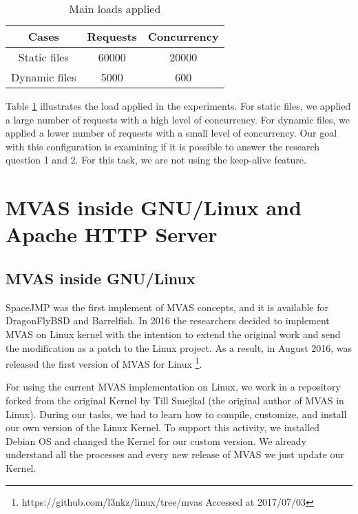 \begin{table}[h!]
  \centering
  \begin{tabular}{|c|c|c|}
    \hline
    Cases & \textbf{Requests} & \textbf{Concurrency}\\
    \hline
    Static files & 60000 & 20000\\
    \hline
    Dynamic files & 5000 & 600 \\
    \hline
  \end{tabular}
  \caption{Main loads applied}
  \label{tab:loads}
\end{table}

Table \ref{tab:loads} illustrates the load applied in the experiments. For
static files, we applied a large number of requests with a high level of
concurrency. For dynamic files, we applied a lower number of requests with a
small level of concurrency. Our goal with this configuration is examining if it
is possible to answer the research question 1 and 2. For this task, we are not
using the keep-alive feature.

\section{MVAS inside GNU/Linux and Apache HTTP Server}
\label{sec:mvas_inside_httpd}

\subsection{MVAS inside GNU/Linux}
 
SpaceJMP \cite{spacejmp} was the first implement of MVAS concepts, and it is
available for DragonFlyBSD and Barrelfish. In 2016 the researchers decided to
implement MVAS on Linux kernel with the intention to extend the original work
and send the modification as a patch to the Linux project. As a result, in
August 2016, was released the first version of MVAS for Linux
\footnote{https://github.com/l3nkz/linux/tree/mvas Accessed at 2017/07/03}.
 
For using the current MVAS implementation on Linux, we work in a repository
forked from the original Kernel by Till Smejkal (the original author of MVAS in
Linux). During our tasks, we had to learn how to compile, customize, and
install our own version of the Linux Kernel. To support this activity, we
installed Debian OS and changed the Kernel for our custom version. We already
understand all the processes and every new release of MVAS we just update our
Kernel.
 
